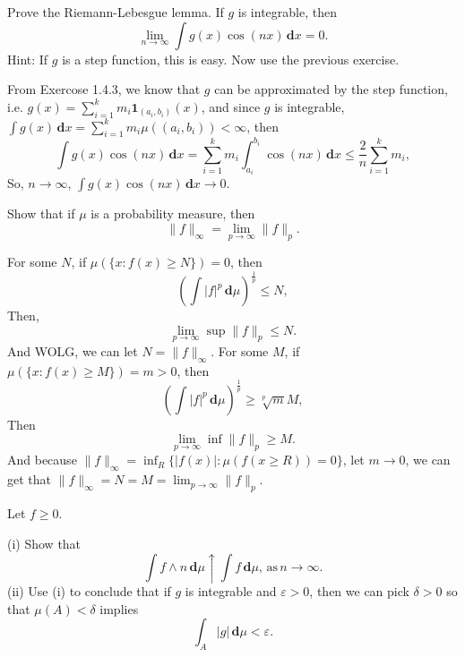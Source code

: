 \documentclass[en, normal, 11pt, black]{elegantnote}
\newenvironment{exercise}[1]{\begin{tcolorbox}[colback=black!15, colframe=black!80, breakable, title=#1]}{\end{tcolorbox}}
\renewenvironment{proof}{\begin{tcolorbox}[colback=white, colframe=black!50, breakable, title=Proof. ]\setlength{\parskip}{0.8em}}{\\\rightline{$\square$}\end{tcolorbox}}
\newcommand{\der}{\,\mathbf{d}}
\begin{document}

    \begin{exercise}{1.4.4}
        Prove the Riemann-Lebesgue lemma. If $g$ is integrable, then 
        \[
            \lim _{n \rightarrow \infty} \int g(x) \cos(nx) \der x=0. 
        \]
        Hint: If $g$ is a step function, this is easy. Now use the previous exercise. 
    \end{exercise}

    \begin{proof}
        From Exercose 1.4.3, we know that $g$ can be approximated by the step function, i.e. $g(x)=\sum_{i=1}^k m_i \mathbf{1}_{(a_i, b_i)}(x)$, and since $g$ is integrable, $\int g(x)\der x=\sum_{i=1}^k m_i\mu((a_i,b_i))<\infty$, then 
        \[
            \int g(x) \cos (n x )\der x=\sum_{i=1}^k m_i \int_{a_i}^{b_i} \cos (n x) \der x\leqslant\frac{2}{n}\sum_{i=1}^k m_i, 
        \]
        So, $n\to \infty$, $\int g(x) \cos (n x )\der x\rightarrow 0$. 
    \end{proof}


    \begin{exercise}{1.5.2}
        Show that if $\mu$ is a probability measure, then
        \[
            \|f\|_{\infty}=\lim_{p\to\infty}\|f\|_p. 
        \]
    \end{exercise}

    \begin{proof}
        For some $N$, if $\mu(\{x:f(x)\geqslant N\})=0$, then
        \[
            \left(\int |f|^p\der\mu\right)^{\frac{1}{p}}\leqslant N, 
        \]
        Then, 
        \[
            \lim_{p\to\infty}\sup\|f\|_p\leqslant N. 
        \]
        And WOLG, we can let $N=\|f\|_\infty$. For some $M$, if $\mu(\{x:f(x)\geqslant M\})=m>0$, then
        \[
            \left(\int|f|^p\der \mu\right)^{\frac{1}{p}}\geqslant\sqrt[p]{m}M, 
        \]
        Then 
        \[
            \lim_{p\to \infty}\inf\|f\|_p\geqslant M. 
        \]
        And because $\|f\|_\infty=\inf_R\{|f(x)|:\mu(f(x\geqslant R))=0\}$, let $m\to0$, we can get that $\|f\|_\infty=N=M=\lim_{p\to\infty}\|f\|_p$. 
    \end{proof}


    \begin{exercise}{1.5.7}
        Let $f\geqslant0$. 
        
        (i) Show that
        \[
            \int f\wedge n\der\mu\uparrow\int f\der\mu,\,\text{as}\,n\to\infty. 
        \]
        (ii) Use (i) to conclude that if $g$ is integrable and $\varepsilon>0$, then we can pick $\delta > 0$ so that $\mu(A) < \delta$ implies
        \[
            \int_A|g|\der\mu<\varepsilon. 
        \]
    \end{exercise}
\end{document}
